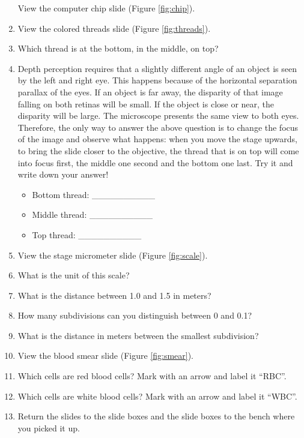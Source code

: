 \begin{enumerate}
  View the computer chip slide (Figure \ref{fig:chip}).
\item
  View the colored threads slide (Figure \ref{fig:threads}).
\item
  Which thread is at the bottom, in the middle, on top?
\item
  Depth perception requires that a slightly different angle of an object is seen by the left and right eye. This happens because of the horizontal separation parallax of the eyes. If an object is far away, the disparity of that image falling on both retinas will be small. If the object is close or near, the disparity will be large. The microscope presents the same view to both eyes. Therefore, the only way to answer the above question is to change the focus of the image and observe what happens: when you move the stage upwards, to bring the slide closer to the objective, the thread that is on top will come into focus first, the middle one second and the bottom one last. Try it and write down your answer!

  \begin{itemize}
  \tightlist
  \item
    Bottom thread: \_\_\_\_\_\_\_\_\_\_
  \item
    Middle thread: \_\_\_\_\_\_\_\_\_\_
  \item
    Top thread: \_\_\_\_\_\_\_\_\_\_
  \end{itemize}
\item
  View the stage micrometer slide (Figure \ref{fig:scale}).
\item
  What is the unit of this scale?
\item
  What is the distance between 1.0 and 1.5 in meters?
\item
  How many subdivisions can you distinguish between 0 and 0.1?
\item
  What is the distance in meters between the smallest subdivision?
\item
  View the blood smear slide (Figure \ref{fig:smear}).
\item
  Which cells are red blood cells? Mark with an arrow and label it ``RBC''.
\item
  Which cells are white blood cells? Mark with an arrow and label it ``WBC''.
\item
  Return the slides to the slide boxes and the slide boxes to the bench where you picked it up.
\end{enumerate}

